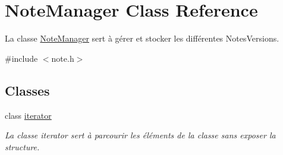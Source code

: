 \hypertarget{classNoteManager}{}\section{Note\+Manager Class Reference}
\label{classNoteManager}


La classe \hyperlink{classNoteManager}{Note\+Manager} sert à gérer et stocker les différentes Notes\+Versions.  




{\ttfamily \#include $<$note.\+h$>$}

\subsection*{Classes}
\begin{DoxyCompactItemize}
\item 
class \hyperlink{classNoteManager_1_1iterator}{iterator}
\begin{DoxyCompactList}\small\item\em La classe iterator sert à parcourir les éléments de la classe sans exposer la structure. \end{DoxyCompactList}\end{DoxyCompactItemize}
